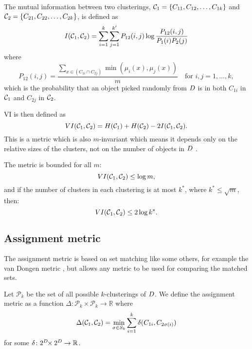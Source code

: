 The mutual information between two clusterings, $\mathcal{C}_1 =
\{C_{11},C_{12},\dotsc,C_{1k}\}$ and $\mathcal{C}_2 =
\{C_{21},C_{22},\dotsc,C_{2k}\}$, is defined as
\begin{equation*}
  I(\mathcal{C}_1,\mathcal{C}_2) = \sum_{i=1}^{k} \sum_{j=1}^{k'} P_{12}(i,j)
  \log \frac{P_{12}(i,j)}{P_{1}(i) P_{2}(j)}
\end{equation*}
where
\begin{equation*}
  P_{12}(i,j) =
  \frac{\displaystyle \sum_{x \in (C_{1i} \cap C_{2j})}
    \min(\mu_i(x),\mu_j(x))}{m}
  \quad \text{for $i,j = 1, \dotsc, k$},
\end{equation*}
which is the probability that an object picked randomly from $D$ is in
both $C_{1i}$ in $\mathcal{C}_1$ and $C_{2j}$ in $\mathcal{C}_2$.

VI is then defined as
\begin{equation*}
  VI(\mathcal{C}_1,\mathcal{C}_2) = H(\mathcal{C}_1) + H(\mathcal{C}_2) - 2I(\mathcal{C}_1,\mathcal{C}_2).
\end{equation*}
This is a metric which is also $m$-invariant which means it depends only on
the relative sizes of the clusters, not on the number of objects in $D$
\cite{meila-2007}.

The metric is bounded \cite{meila-2007} for all $m$:
\begin{equation*}
  VI(\mathcal{C}_1,\mathcal{C}_2) \leq \log m,
\end{equation*}
and if the number of clusters in each clustering is at most $k^{*}$, where
$k^{*} \leq \sqrt{m}$, then:
\begin{equation*}
  VI(\mathcal{C}_1,\mathcal{C}_2) \leq 2 \log k^{*}.
\end{equation*}

\subsection{Assignment metric}
\label{sec:assignment-metric}

The assignment metric is based on set matching like some others, for example
the van Dongen metric \cite{van-dongen-2000}, but allows any metric to be used
for comparing the matched sets.

Let $\mathcal{P}_k$ be the set of all possible $k$-clusterings of $D$.
We define the assignment metric as a function $\Delta \colon \mathcal{P}_k
\!\times \mathcal{P}_k \to \mathbb{R}$ where
\begin{equation*}
  \Delta(\mathcal{C}_1, \mathcal{C}_2) = \min_{\sigma \in S_k} \sum_{i=1}^{k}
  \delta(C_{1i}, C_{2\sigma(i)})
\end{equation*}
for some $\delta \colon 2^{D} \!\!\times 2^{D} \to \mathbb{R}$.

